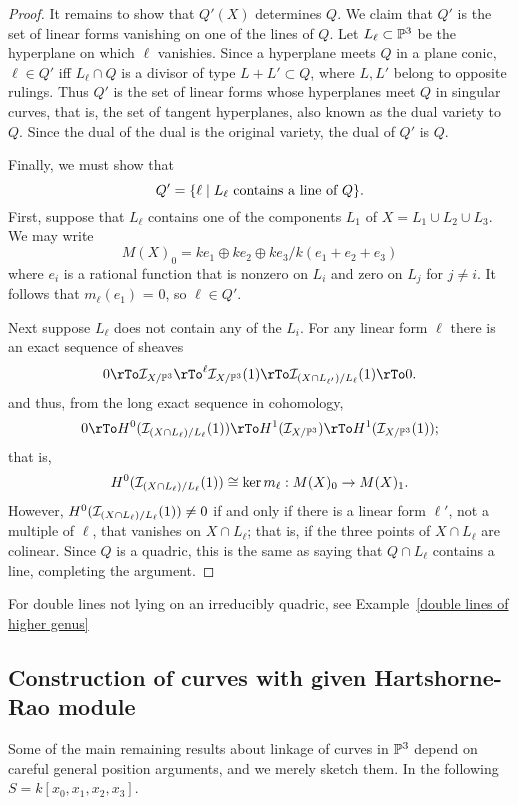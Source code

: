 \begin{example}
\begin{proof}
It remains to show that $Q'(X)$ determines $Q$. We claim that $Q'$ is the set of linear forms vanishing on one of the lines of $Q$. Let $L_{\ell}\subset \PP^{3}$ be the hyperplane on which $\ell$ vanishies. Since a hyperplane meets $Q$ in a plane conic, $\ell\in Q'$ iff $L_{\ell}\cap Q$ is a divisor of type $L+L'\subset Q$, where 
$L,L'$ belong to opposite rulings. Thus $Q'$ is the set of linear forms whose hyperplanes meet $Q$ in singular curves, that is, the set of tangent hyperplanes, also known as the dual variety to $Q$. Since the dual of the dual is the original variety, the dual of $Q'$ is $Q$. 

Finally, we must show that 
$$
Q' = \{\ell \mid L_{\ell} \hbox{ contains a line of }Q\}.
$$
First, suppose that $L_{\ell}$ contains one of the components $L_{1}$ of $X = L_{1}\cup L_{2}\cup L_{3}$.
We may write 
$$
M(X)_{0} = ke_{1}\oplus ke_{2}\oplus ke_{3}/k(e_{1}+e_{2}+e_{3})
$$
where $e_{i}$ is a rational function that is nonzero on $L_{i}$ and zero on $L_{j}$ for $j\neq i$. It follows
that $m_{\ell}(e_{1})$ = 0, so $\ell\in Q'$.

Next suppose $L_{\ell}$ does not contain any of the $L_{i}$. For any linear form $\ell$ there is an exact sequence of sheaves
$$
0\rTo \sI_{X/\PP^{3}} \rTo^{\ell} \sI_{X/\PP^{3}}(1) \rTo \sI_{(X\cap L_{\ell'})/L_{\ell}}(1) \rTo 0.
$$
and thus, from the long exact sequence in cohomology,
$$
0\rTo H^{0}(\sI_{(X\cap L_{\ell})/L_{\ell}}(1)) \rTo H^{1}(\sI_{X/\PP^{3}} ) \rTo H^{1}(\sI_{X/\PP^{3}}(1)); 
$$
that is, 
$$
H^{0}(\sI_{(X\cap L_{\ell})/L_{\ell}}(1)) \cong \ker m_{\ell}: M(X)_{0} \to M(X)_{1}.
$$
However, $H^{0}(\sI_{(X\cap L_{\ell})/L_{\ell}}(1)) \neq 0$ if and only if there is a linear form
$\ell'$, not a multiple of $\ell$, that vanishes on $X\cap L_{\ell}$; that is, if the three points of $X\cap L_{\ell}$
are colinear. Since $Q$ is a quadric, this is the same as saying that $Q\cap L_{\ell}$ contains a line, completing the argument.
\end{proof}
\end{example}

For double lines not lying on an irreducibly quadric, see Example~\ref{double lines of higher genus}
\subsection{Construction of curves with given Hartshorne-Rao module}

Some of the main remaining results about linkage of curves in $\PP^3$ depend on careful general position arguments, and we merely
sketch them. In the following $S = k[x_0,x_1,x_2,x_3]$.

